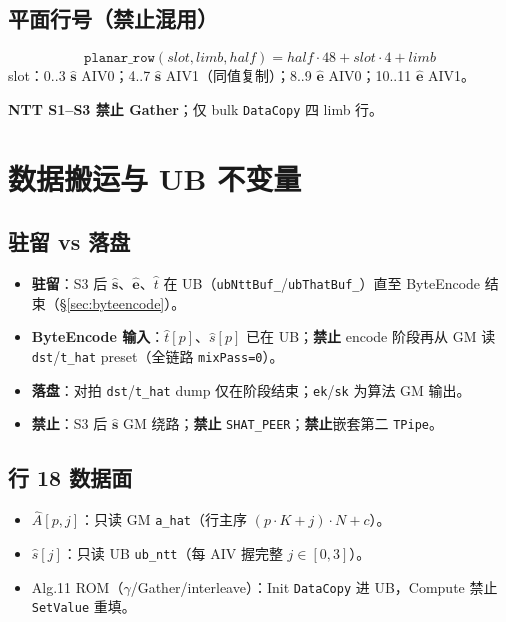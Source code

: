 \documentclass[UTF8,a4paper,11pt]{ctexart}
\begin{document}
\subsection{平面行号（禁止混用）}
\[
  \texttt{planar\_row}(\mathit{slot},\mathit{limb},\mathit{half})
  = \mathit{half}\cdot 48 + \mathit{slot}\cdot 4 + \mathit{limb}
\]
slot：0..3 $\hat{\mathbf{s}}$ AIV0；4..7 $\hat{\mathbf{s}}$ AIV1（同值复制）；8..9 $\hat{\mathbf{e}}$ AIV0；10..11 $\hat{\mathbf{e}}$ AIV1。

\textbf{NTT S1–S3 禁止 Gather}；仅 bulk \texttt{DataCopy} 四 limb 行。

\section{数据搬运与 UB 不变量}

\subsection{驻留 vs 落盘}
\begin{itemize}
  \item \textbf{驻留}：S3 后 $\hat{\mathbf{s}}$、$\hat{\mathbf{e}}$、$\hat{t}$ 在 UB（\texttt{ubNttBuf\_}/\texttt{ubThatBuf\_}）直至 ByteEncode 结束（§\ref{sec:byteencode}）。
  \item \textbf{ByteEncode 输入}：$\hat{t}[p]$、$\hat{s}[p]$ 已在 UB；\textbf{禁止} encode 阶段再从 GM 读 \texttt{dst}/\texttt{t\_hat} preset（全链路 \texttt{mixPass=0}）。
  \item \textbf{落盘}：对拍 \texttt{dst}/\texttt{t\_hat} dump 仅在阶段结束；\texttt{ek}/\texttt{sk} 为算法 GM 输出。
  \item \textbf{禁止}：S3 后 $\hat{\mathbf{s}}$ GM 绕路；\textbf{禁止} \texttt{SHAT\_PEER}；\textbf{禁止}嵌套第二 \texttt{TPipe}。
\end{itemize}

\subsection{行 18 数据面}
\begin{itemize}
  \item $\widehat{A}[p,j]$：只读 GM \texttt{a\_hat}（行主序 $(p{\cdot}K{+}j){\cdot}N{+}c$）。
  \item $\hat{s}[j]$：只读 UB \texttt{ub\_ntt}（每 AIV 握完整 $j\in[0,3]$）。
  \item Alg.11 ROM（$\gamma$/Gather/interleave）：Init \texttt{DataCopy} 进 UB，Compute 禁止 \texttt{SetValue} 重填。
\end{itemize}
\end{document}
